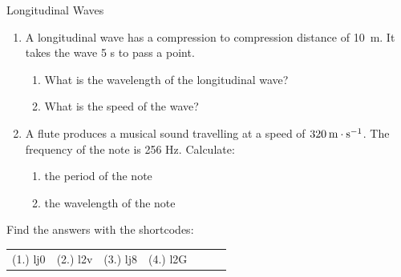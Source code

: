 \begin{eocexercises}{Longitudinal Waves}
\begin{enumerate}[noitemsep, label=\textbf{\arabic*}. ]
    \par
          \label{m38783*uid38}\item A longitudinal wave has a compression to compression distance of 10~m. It takes the wave 5 s to pass a point.
\label{m38783*id294078}\begin{enumerate}[noitemsep, label=\textbf{\alph*}. ] 
            \label{m38783*uid39}\item What is the wavelength of the longitudinal wave?
\label{m38783*uid40}\item What is the speed of the wave?
\end{enumerate}
                \label{m38783*uid41}\item A flute produces a musical sound travelling at a speed of $320\phantom{\rule{2pt}{0ex}}\text{m}\ensuremath{\cdot}\text{s}{}^{-1}$. The frequency of the note is 256 Hz. Calculate:
\label{m38783*id294137}\begin{enumerate}[noitemsep, label=\textbf{\alph*}. ] 
            \label{m38783*uid42}\item the period of the note
\label{m38783*uid43}\item the wavelength of the note
\end{enumerate}
                \end{enumerate}
  \label{m38783**end}
  \label{e91550bed2a1600e0ddb2572d580bf8e**end}
\par {} Find the answers with the shortcodes:
 \par \begin{tabular}[h]{cccccc}
 (1.) lj0  &  (2.) l2v  &  (3.) lj8  &  (4.) l2G  &    &    &    & \end{tabular}
\end{eocexercises}
